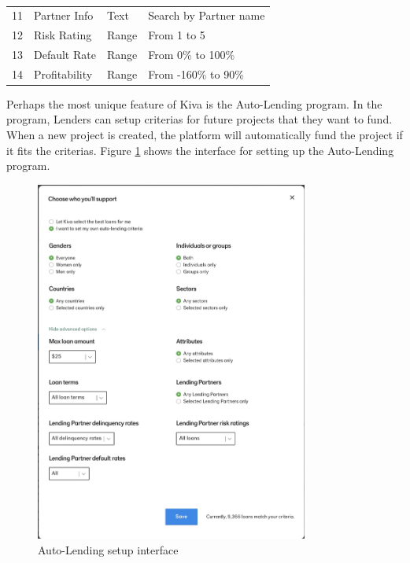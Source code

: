 \begin{table}[H]
{\begin{tabular}{|l|l|l|l|}
			11 & Partner Info                  & Text            & Search by Partner name                                                                                                  \\
			12 & Risk Rating                   & Range           & From 1 to 5                                                                                                             \\
			13 & Default Rate                  & Range           & From 0\% to 100\%                                                                                                       \\
			14 & Profitability                 & Range           & From -160\% to 90\%                                                                                                     \\
			\hline
		\end{tabular}%
	}
	\caption{ \cite{kiva-browse}}
	\label{tab:browser-criteria}
\end{table}

Perhaps the most unique feature of Kiva is the Auto-Lending program.
In the program, Lenders can setup criterias for future projects that they want to fund.
When a new project is created, the platform will automatically fund the project if it fits the criterias.
Figure \ref{fig:auto-lend-setup} shows the interface for setting up the Auto-Lending program.

\begin{figure}[H]
	\centering
	\includegraphics[width=0.8\textwidth]{images/auto-lend-setup.png}
	\caption{Auto-Lending setup interface \cite{kiva-autolend2}}
	\label{fig:auto-lend-setup}
\end{figure}

